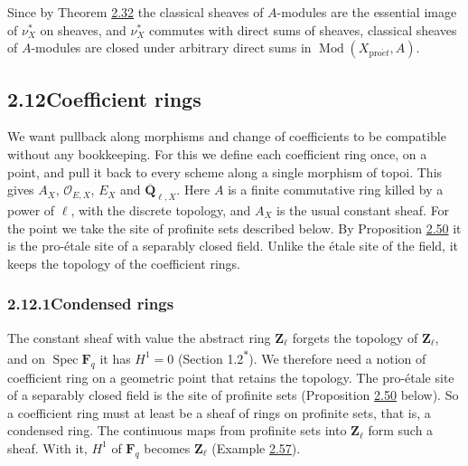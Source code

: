 \documentclass[11pt]{article}
\newcommand{\bpout}[1]{#1\textsuperscript{\hyperlink{bp-outside}{\ensuremath{\ast}}}}
\providecommand{\QbarX}{}\renewcommand{\QbarX}{\overline{\mathbf Q}_{\ell,X}}
\begin{document}
\label{bp148}%
Since by Theorem \hyperref[bp95]{2.32} the classical sheaves of \(A\)-modules are the essential image of \(\nu_X^*\) on sheaves, and \(\nu_X^*\) commutes with direct sums of sheaves, classical sheaves of \(A\)-modules are closed under arbitrary direct sums in \(\operatorname{Mod}(X_{\mathrm{pro}\acute{e}t},A)\).


\subsection*{\texorpdfstring{2.12\quad Coefficient rings}{2.12 Coefficient rings}}
\label{bp149}%
\label{bp150}%
We want pullback along morphisms and change of coefficients to be compatible without any bookkeeping. For this we define each coefficient ring once, on a point, and pull it back to every scheme along a single morphism of topoi. This gives \(A_X\), \(\mathcal O_{E,X}\), \(E_X\) and \(\QbarX\). Here \(A\) is a finite commutative ring killed by a power of \(\ell\), with the discrete topology, and \(A_X\) is the usual constant sheaf. For the point we take the site of profinite sets described below. By Proposition \hyperref[bp153]{2.50} it is the pro-étale site of a separably closed field. Unlike the étale site of the field, it keeps the topology of the coefficient rings.

\subsubsection*{\texorpdfstring{2.12.1\quad Condensed rings}{2.12.1 Condensed rings}}
\label{bp151}%
\label{bp152}%
The constant sheaf with value the abstract ring \(\mathbf Z_\ell\) forgets the topology of \(\mathbf Z_\ell\), and on \(\operatorname{Spec}\mathbf F_q\) it has \(H^1=0\) (Section \bpout{1.2}). We therefore need a notion of coefficient ring on a geometric point that retains the topology. The pro-étale site of a separably closed field is the site of profinite sets (Proposition \hyperref[bp153]{2.50} below). So a coefficient ring must at least be a sheaf of rings on profinite sets, that is, a condensed ring. The continuous maps from profinite sets into \(\mathbf Z_\ell\) form such a sheaf. With it, \(H^1\) of \(\mathbf F_q\) becomes \(\mathbf Z_\ell\) (Example \hyperref[bp178]{2.57}).
\end{document}

